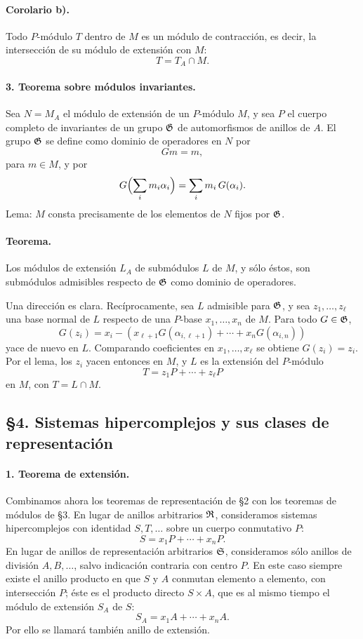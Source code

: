 \paragraph{Corolario b).}
Todo \(P\)-módulo \(T\) dentro de \(M\) es un módulo de contracción, es decir, la intersección de su módulo de extensión con \(M\):
\[
        T=T_A\cap M .
\]

\paragraph{3. Teorema sobre módulos invariantes.}
Sea \(N=M_A\) el módulo de extensión de un \(P\)-módulo \(M\), y sea \(P\) el cuerpo completo de invariantes de un grupo \(\mathfrak G\) de automorfismos de anillos de \(A\). El grupo \(\mathfrak G\) se define como dominio de operadores en \(N\) por
\[
        Gm=m,
\]
para \(m\in M\), y por
\[
        G\Bigl(\sum_i m_i\alpha_i\Bigr)=\sum_i m_i\,G(\alpha_i).
\]
Lema: \(M\) consta precisamente de los elementos de \(N\) fijos por \(\mathfrak G\).

\paragraph{Teorema.}
Los módulos de extensión \(L_A\) de submódulos \(L\) de \(M\), y sólo éstos, son submódulos admisibles respecto de \(\mathfrak G\) como dominio de operadores.

Una dirección es clara. Recíprocamente, sea \(L\) admisible para \(\mathfrak G\), y sea \(z_1,\ldots,z_\ell\) una base normal de \(L\) respecto de una \(P\)-base \(x_1,\ldots,x_n\) de \(M\). Para todo \(G\in\mathfrak G\),
\[
        G(z_i)=x_i-(x_{\ell+1}G(\alpha_{i,\ell+1})+\cdots+x_nG(\alpha_{i,n}))
\]
yace de nuevo en \(L\). Comparando coeficientes en \(x_1,\ldots,x_\ell\) se obtiene \(G(z_i)=z_i\). Por el lema, los \(z_i\) yacen entonces en \(M\), y \(L\) es la extensión del \(P\)-módulo
\[
        T=z_1P+\cdots+z_\ell P
\]
en \(M\), con \(T=L\cap M\).

\subsection*{§4. Sistemas hipercomplejos y sus clases de representación}

\paragraph{1. Teorema de extensión.}
Combinamos ahora los teoremas de representación de §2 con los teoremas de módulos de §3. En lugar de anillos arbitrarios \(\mathfrak R\), consideramos sistemas hipercomplejos con identidad \(S,T,\ldots\) sobre un cuerpo conmutativo \(P\):
\[
        S=x_1P+\cdots+x_nP.
\]
En lugar de anillos de representación arbitrarios \(\mathfrak S\), consideramos sólo anillos de división \(A,B,\ldots\), salvo indicación contraria con centro \(P\). En este caso siempre existe el anillo producto en que \(S\) y \(A\) conmutan elemento a elemento, con intersección \(P\); éste es el producto directo \(S\times A\), que es al mismo tiempo el módulo de extensión \(S_A\) de \(S\):
\[
        S_A=x_1A+\cdots+x_nA.
\]
Por ello se llamará también anillo de extensión.


